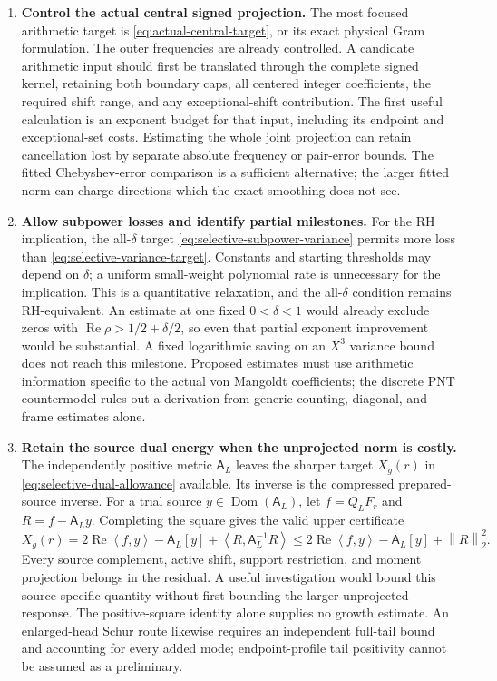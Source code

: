 \documentclass[11pt]{article}
\numberwithin{equation}{section}
\theoremstyle{definition}
\theoremstyle{remark}
\newcommand{\Rea}{\operatorname{Re}}
\newcommand{\norm}[1]{\left\lVert #1\right\rVert}
\newcommand{\inner}[2]{\left\langle #1,#2\right\rangle}
\begin{document}
\begin{enumerate}[label=\arabic*.,leftmargin=*]
\item \textbf{Control the actual central signed projection.}
The most focused arithmetic target is
\eqref{eq:actual-central-target}, or its exact physical Gram formulation.
The outer frequencies are already controlled. A candidate arithmetic
input should first be translated through the complete signed kernel,
retaining both boundary caps, all centered integer coefficients,
the required shift range, and any exceptional-shift contribution.
The first useful calculation is an exponent budget for that input,
including its endpoint and exceptional-set costs. Estimating the whole
joint projection can retain cancellation lost by separate absolute
frequency or pair-error bounds. The fitted Chebyshev-error comparison
is a sufficient alternative; the larger fitted norm can charge
directions which the exact smoothing does not see.

\item \textbf{Allow subpower losses and identify partial milestones.}
For the RH implication, the all-\(\delta\) target
\eqref{eq:selective-subpower-variance} permits more loss than
\eqref{eq:selective-variance-target}. Constants and starting thresholds
may depend on \(\delta\); a uniform small-weight polynomial rate is
unnecessary for the implication. This is a quantitative relaxation,
and the all-\(\delta\) condition remains RH-equivalent. An estimate at
one fixed \(0<\delta<1\) would already exclude zeros with
\(\Rea\rho>1/2+\delta/2\), so even that partial exponent improvement
would be substantial. A fixed logarithmic saving on an \(X^3\)
variance bound does not reach this milestone. Proposed estimates must
use arithmetic information specific to the actual von Mangoldt
coefficients; the discrete PNT countermodel rules out a derivation
from generic counting, diagonal, and frame estimates alone.

\item \textbf{Retain the source dual energy when the unprojected norm is costly.}
The independently positive metric \(\mathsf A_L\) leaves the sharper
target \(X_g(r)\) in \eqref{eq:selective-dual-allowance} available.
Its inverse is the compressed prepared-source inverse. For a trial source \(y\in\operatorname{Dom}(\mathsf A_L)\), let \(f=Q_LF_r\) and \(R=f-\mathsf A_Ly\).
Completing the square gives the valid upper certificate
\[
X_g(r)=2\Rea\inner{f}{y}-\mathsf A_L[y]
+\inner{R}{\mathsf A_L^{-1}R}
\le2\Rea\inner{f}{y}-\mathsf A_L[y]+\norm R_2^2.
\]
Every source complement, active shift, support restriction, and moment
projection belongs in the residual. A useful investigation would bound
this source-specific quantity without first bounding the larger
unprojected response. The positive-square identity alone supplies no
growth estimate. An enlarged-head Schur route likewise requires an
independent full-tail bound and accounting for every added mode;
endpoint-profile tail positivity cannot be assumed as a preliminary.


\end{enumerate}
\end{document}
